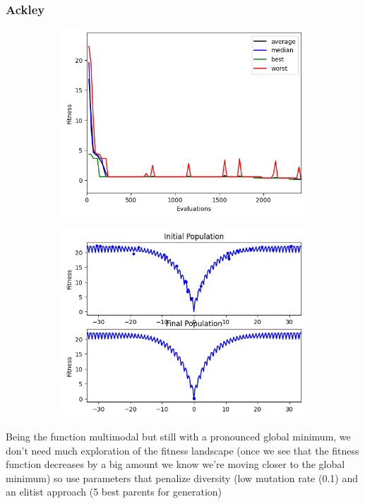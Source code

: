 \subsubsection{Ackley}
\begin{figure}[H]
    \centering
    \begin{subfigure}[t]{0.5\textwidth}
        \centering
        \includegraphics[width=\linewidth]{images/lab2/ack_eval.png}
    \end{subfigure}%
    \begin{subfigure}[t]{0.5\textwidth}
        \centering
        \includegraphics[width=\linewidth]{images/lab2/ack_pop.png}
    \end{subfigure}
\end{figure}
Being the function multimodal but still with a pronounced global minimum, we don't need much exploration of the fitness landscape (once we see that the fitness function decreases by a big amount we know we're moving closer to the global minimum) so use parameters that penalize diversity (low mutation rate (0.1) and an elitist approach (5 best parents for generation)

